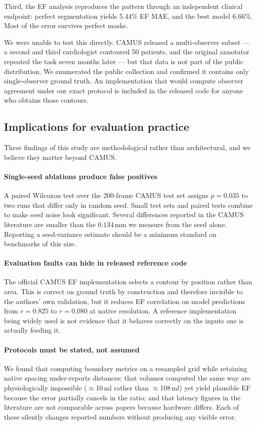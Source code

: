 Third, the EF analysis reproduces the pattern through an independent clinical
endpoint: perfect segmentation yields $5.44\%$ EF MAE, and the best model
$6.66\%$. Most of the error survives perfect masks.

We were unable to test this directly. CAMUS released a multi-observer subset ---
a second and third cardiologist contoured 50 patients, and the original
annotator repeated the task seven months later --- but that data is not part of
the public distribution. We enumerated the public collection and confirmed it
contains only single-observer ground truth. An implementation that would compute
observer agreement under our exact protocol is included in the released code for
anyone who obtains those contours.

\subsection{Implications for evaluation practice}

Three findings of this study are methodological rather than architectural, and
we believe they matter beyond CAMUS.

\paragraph{Single-seed ablations produce false positives} A paired Wilcoxon test
over the 200-frame CAMUS test set assigns $p{=}0.035$ to two runs that differ
only in random seed. Small test sets and paired tests combine to make seed noise
look significant. Several differences reported in the CAMUS literature are
smaller than the $0.134$\,mm we measure from the seed alone. Reporting a
seed-variance estimate should be a minimum standard on benchmarks of this size.

\paragraph{Evaluation faults can hide in released reference code} The official
CAMUS EF implementation selects a contour by position rather than area. This is
correct on ground truth by construction and therefore invisible to the authors'
own validation, but it reduces EF correlation on model predictions from
$r{=}0.825$ to $r{=}0.080$ at native resolution. A reference implementation
being widely used is not evidence that it behaves correctly on the inputs one is
actually feeding it.

\paragraph{Protocols must be stated, not assumed} We found that computing
boundary metrics on a resampled grid while retaining native spacing
under-reports distances; that volumes computed the same way are physiologically
impossible ($\approx$10\,ml rather than $\approx$108\,ml) yet yield plausible EF
because the error partially cancels in the ratio; and that latency figures in
the literature are not comparable across papers because hardware differs. Each
of these silently changes reported numbers without producing any visible error.

